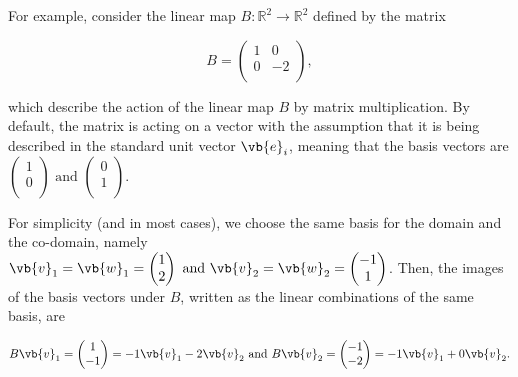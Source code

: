 \documentclass[a4paper,12pt]{report}
\begin{document}
For example, consider the linear map \(B: \mathbb{R}^2 \rightarrow \mathbb{R}^2\) defined by the matrix

\begin{equation}
    B = \begin{pmatrix}
        1 &  0 \\
        0 &  -2 \\
    \end{pmatrix},
\end{equation}

which describe the action of the linear map \(B\) by matrix multiplication. By default, the matrix is acting on a vector with the assumption that it is being described in the standard unit vector \(\vb{e}_{i} \), meaning that the basis vectors are \(\begin{pmatrix}
     1 \\
     0 \\
\end{pmatrix} \text { and } \begin{pmatrix}
     0 \\
     1 \\
\end{pmatrix}  \).    

For simplicity (and in most cases), we choose the same basis for the domain and the co-domain, namely \(\vb{v} _{1} = \vb{w} _{1} = \begin{pmatrix}
     1 \\
     2 \\
\end{pmatrix} \text { and } \vb{v} _{2} = \vb{w} _{2} = \begin{pmatrix}
     -1 \\
     1 \\
\end{pmatrix}    \). Then, the images of the basis vectors under \(B\), written as the linear combinations of the same basis, are

\begin{equation}
    B\vb{v} _{1} = \begin{pmatrix}
         1 \\
         -1 \\
    \end{pmatrix} = -1\vb{v} _{1}  - 2 \vb{v} _{2} \text { and } B\vb{v} _{2} = \begin{pmatrix}
         -1 \\
         -2 \\
    \end{pmatrix} = -1\vb{v} _{1} +0\vb{v} _{2} . 
\end{equation}
\end{document}
